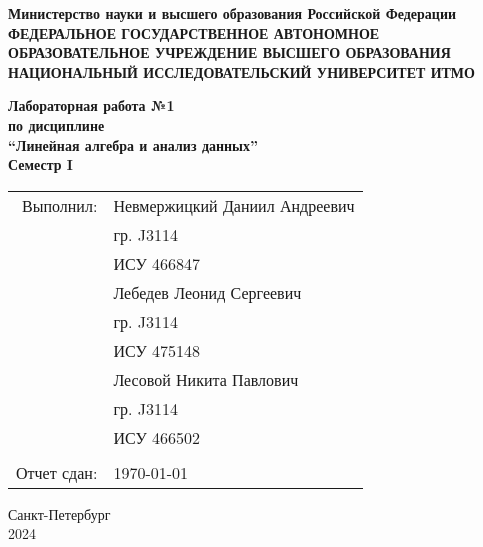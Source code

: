 
	\begin{center}
		\textbf{Министерство науки и высшего образования Российской Федерации} \\
		\vspace{0.2cm}
		\textbf{ФЕДЕРАЛЬНОЕ ГОСУДАРСТВЕННОЕ АВТОНОМНОЕ} \\
		\textbf{ОБРАЗОВАТЕЛЬНОЕ УЧРЕЖДЕНИЕ ВЫСШЕГО ОБРАЗОВАНИЯ} \\
		\textbf{НАЦИОНАЛЬНЫЙ ИССЛЕДОВАТЕЛЬСКИЙ УНИВЕРСИТЕТ ИТМО} \\
	\end{center}
	
	\vspace{5cm}
	
	\begin{center}
		\textbf{\LARGE{Лабораторная работа №1 \\
				по дисциплине \\``Линейная алгебра и анализ данных''}} \\
		\vspace{1cm}
		\textbf{\LARGE{Семестр I}}
	\end{center}
	
	\vspace{2cm}
	
	\begin{flushright}
		\begin{tabular}{rl}
			Выполнил: & Невмержицкий Даниил Андреевич  \\
            & гр. J3114 \\
            & ИСУ 466847 \\
            & Лебедев Леонид Сергеевич \\
            & гр. J3114 \\
            & ИСУ 475148 \\
            & Лесовой Никита Павлович \\
            & гр. J3114 \\
			& ИСУ 466502 \\
			\\
			Отчет сдан: & \today \\
		\end{tabular}
	\end{flushright}
	
	\vspace{4cm}
	
	\begin{center}
		Санкт-Петербург \\
		2024
	\end{center}
	
